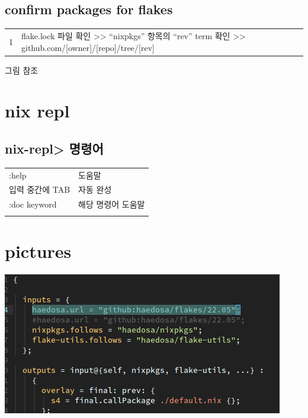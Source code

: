 \documentclass[a4paper,11pt]{article}
\begin{document}
\subsection*{confirm packages for flakes}
\label{sec:org38bb56a}
\begin{center}
\begin{tabular}{rl}
1 & flake.lock 파일 확인 >> ``nixpkgs'' 항목의 ``rev'' term 확인 >> github.com/[owner]/[repo]/tree/[rev]\\
\end{tabular}
\end{center}
그림 참조

\section*{nix repl}
\label{sec:org5958795}
\subsection*{nix-repl> 명령어}
\label{sec:org2c3d9d5}
\begin{center}
\begin{tabular}{ll}
:help & 도움말\\
입력 중간에 TAB & 자동 완성\\
:doc keyword & 해당 명령어 도움말\\
 & \\
\end{tabular}
\end{center}

\section*{pictures}
\label{sec:orgdd59ef3}
\begin{center}
\includegraphics[width=.9\linewidth]{./img/3_nix/flake input url.png}
\label{flake input url}
\end{center}
\end{document}
